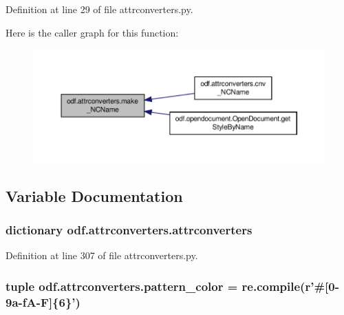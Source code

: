 Definition at line 29 of file attrconverters.\+py.



Here is the caller graph for this function\+:
\nopagebreak
\begin{figure}[H]
\begin{center}
\leavevmode
\includegraphics[width=350pt]{namespaceodf_1_1attrconverters_a6755b6a5aedaf9689050ad84c4ede320_icgraph}
\end{center}
\end{figure}




\subsection{Variable Documentation}
\hypertarget{namespaceodf_1_1attrconverters_aa546908cd138bdd3bd7fd61e75ebc87f}{
\subsubsection[{attrconverters}]{\setlength{\rightskip}{0pt plus 5cm}dictionary odf.\+attrconverters.\+attrconverters}}\label{namespaceodf_1_1attrconverters_aa546908cd138bdd3bd7fd61e75ebc87f}


Definition at line 307 of file attrconverters.\+py.

\hypertarget{namespaceodf_1_1attrconverters_a942ee7e8270b6cb9f232b85d91f167cc}{
\subsubsection[{pattern\+\_\+color}]{\setlength{\rightskip}{0pt plus 5cm}tuple odf.\+attrconverters.\+pattern\+\_\+color = re.\+compile(r'\#\mbox{[}0-\/9a-\/f\+A-\/\+F\mbox{]}\{6\}')}}\label{namespaceodf_1_1attrconverters_a942ee7e8270b6cb9f232b85d91f167cc}


